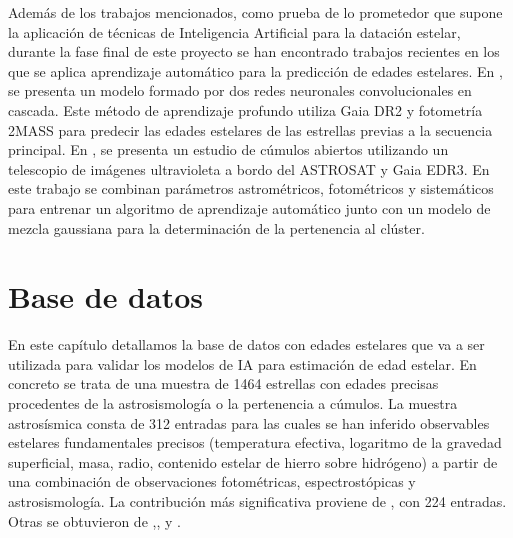 Además de los trabajos mencionados, como prueba de lo prometedor que supone la aplicación de técnicas de Inteligencia Artificial para la datación estelar, durante la fase final de este proyecto se han encontrado trabajos recientes en los que se aplica aprendizaje automático para la predicción de edades estelares. En \cite{2020AAS...23633104M}, se presenta un modelo formado por dos redes neuronales convolucionales en cascada. Este método de aprendizaje profundo utiliza Gaia DR2 y fotometría 2MASS para predecir las edades estelares de las estrellas previas a la secuencia principal. En \cite{Jadhav_2021}, se presenta un estudio de cúmulos abiertos utilizando un telescopio de imágenes ultravioleta a bordo del ASTROSAT y Gaia EDR3. En este trabajo se combinan parámetros astrométricos, fotométricos y sistemáticos para entrenar un algoritmo de aprendizaje automático junto con un modelo de mezcla gaussiana para la determinación de la pertenencia al clúster.


\chapter{Base de datos}
\label{sec:data}
En este capítulo detallamos la base de datos con edades estelares que va a ser utilizada para validar los modelos de IA para estimación de edad estelar.
En concreto se trata de una muestra de 1464 estrellas con edades precisas procedentes de la astrosismología o la pertenencia a cúmulos. La muestra astrosísmica consta de 312 entradas para las cuales se han inferido observables estelares fundamentales precisos (temperatura efectiva, logaritmo de la gravedad superficial, masa, radio, contenido estelar de hierro sobre hidrógeno) a partir de una combinación de observaciones fotométricas, espectrostópicas y astrosismología. La contribución más significativa proviene de \cite{Serenelli17}, con 224 entradas. Otras se obtuvieron de \cite{Ceillier16},\cite{Garcia14},\cite{Silva15} y \cite{Silva17}. %

\begin{table}[H]
\centering
\centering
{}
\caption{Características proporcionadas en la base de datos para cada estrella.}\label{table:data}
\end{table}

